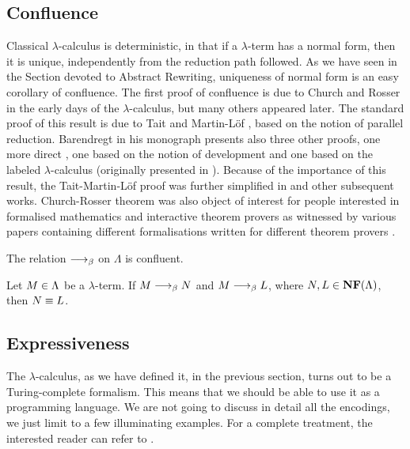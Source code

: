 \subsection{Confluence}
Classical $\lambda$-calculus is deterministic, in that if a $\lambda$-term has a normal form, then it is unique, independently from the reduction path followed. As we have seen in the Section devoted to Abstract Rewriting, uniqueness of normal form is an easy corollary of confluence. The first proof of confluence is due to Church and Rosser \cite{church_properties_1936} in the early days of the $\lambda$-calculus, but many others appeared later. The standard proof of this result is due to Tait and Martin-Löf \cite[Section~3.2]{barendregt_lambda_1984}, based on the notion of parallel reduction. Barendregt in his monograph presents also three other proofs, one more direct \cite[Section~11.1]{barendregt_lambda_1984}, one based on the notion of development \cite[Section~11.2]{barendregt_lambda_1984} and one based on the labeled $\lambda$-calculus \cite[Section~14.2]{barendregt_lambda_1984} (originally presented in \cite{levy_reductions_1978}). Because of the importance of this result, the Tait-Martin-Löf proof was further simplified in \cite{takahashi_parallel_1995} and other subsequent works. Church-Rosser theorem was also object of interest for people interested in formalised mathematics and interactive theorem provers as witnessed by various papers containing different formalisations written for different theorem provers \cite{shankar_mechanical_1988,huet_residual_1994}.
\begin{theorem}
	The relation $\longrightarrow_\beta$ on $\Lambda$ is confluent.
\end{theorem}
\begin{corollary}
	Let $M\in\Lambda$ be a $\lambda$-term. If $M\longrightarrow_\beta N$ and $M\longrightarrow_\beta L$, where $N,L\in\textbf{NF}(\Lambda)$, then $N\equiv L$.
\end{corollary}
\subsection{Expressiveness}
The $\lambda$-calculus, as we have defined it, in the previous section, turns out to be a Turing-complete formalism. This means that we should be able to use it as a programming language. We are not going to discuss in detail all the encodings, we just limit to a few illuminating examples. For a complete treatment, the interested reader can refer to \cite{barendregt_lambda_1984}.
